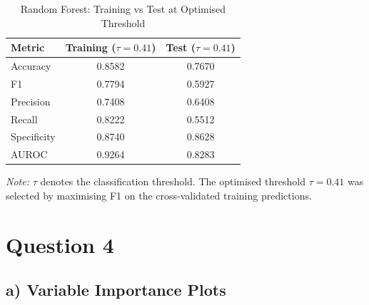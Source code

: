 \documentclass[11pt]{article}\usepackage[]{graphicx}\usepackage[]{xcolor}
\begin{document}
\begin{table}[htbp]
\centering
\caption{Random Forest: Training vs Test at Optimised Threshold}
\label{tab:rf_threshold}
\begin{tabular}{lcc}
\toprule
\textbf{Metric} & \textbf{Training} ($\tau = 0.41$) & \textbf{Test} ($\tau = 0.41$) \\
\midrule
Accuracy    & 0.8582 & 0.7670 \\
F1          & 0.7794 & 0.5927 \\
Precision   & 0.7408 & 0.6408 \\
Recall      & 0.8222 & 0.5512 \\
Specificity & 0.8740 & 0.8628 \\
AUROC       & 0.9264 & 0.8283 \\
\bottomrule
\end{tabular}
\par\smallskip
\footnotesize{\textit{Note:} $\tau$ denotes the classification threshold. The optimised threshold $\tau = 0.41$ was selected by maximising F1 on the cross-validated training predictions.}
\end{table}
 

\section*{Question 4}
\subsection*{a) Variable Importance Plots}
\end{document}
